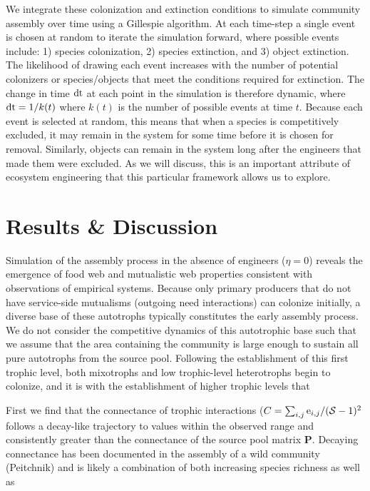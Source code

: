 \documentclass[twocolumn,preprintnumbers,amsmath,amssymb,superscriptaddress]{revtex4}
\newcommand{\rr}[1]{{\rm #1}}
\begin{document}
We integrate these colonization and extinction conditions to simulate community assembly over time using a Gillespie algorithm.
At each time-step a single event is chosen at random to iterate the simulation forward, where possible events include: 1) species colonization, 2) species extinction, and 3) object extinction.
The likelihood of drawing each event increases with the number of potential colonizers or species/objects that meet the conditions required for extinction.
The change in time $\rr{dt}$ at each point in the simulation is therefore dynamic, where $\rr{dt} = 1/k(t)$ where $k(t)$ is the number of possible events at time $t$.
Because each event is selected at random, this means that when a species is competitively excluded, it may remain in the system for some time before it is chosen for removal.
Similarly, objects can remain in the system long after the engineers that made them were excluded.
As we will discuss, this is an important attribute of ecosystem engineering that this particular framework allows us to explore.


\section*{Results \& Discussion}
Simulation of the assembly process in the absence of engineers ($\eta=0$) reveals the emergence of food web and mutualistic web properties consistent with observations of empirical systems.
Because only primary producers that do not have service-side mutualisms (outgoing need interactions) can colonize initially, a diverse base of these autotrophs typically constitutes the early assembly process.
We do not consider the competitive dynamics of this autotrophic base such that we assume that the area containing the community is large enough to sustain all pure autotrophs from the source pool.
Following the establishment of this first trophic level, both mixotrophs and low trophic-level heterotrophs begin to colonize, and it is with the establishment of higher trophic levels that 

First we find that the connectance of trophic interactions ($C=\sum_{i,j} \rr{e}_{i,j}/(\mathcal{S}-1)^2$ follows a decay-like trajectory to values within the observed range and consistently greater than the connectance of the source pool matrix $\bm{P}$.
Decaying connectance has been documented in the assembly of a wild community (Peitchnik) and is likely a combination of both increasing species richness as well as 
\end{document}

